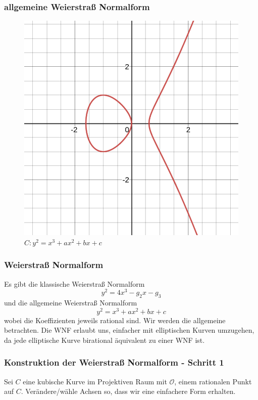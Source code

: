\documentclass{beamer}
\begin{document}
\begin{frame}
\frametitle{allgemeine Weierstraß Normalform}
    \begin{figure}
		\caption{$C: y^2=x^3+ax^2+bx+c$}
		\includegraphics[scale=0.3]{images/desmos-graph02.png}
    \end{figure}
\end{frame}

\begin{frame}
\frametitle{Weierstraß Normalform}
	Es gibt die klassische Weierstraß Normalform
	\[y^2=4x^3-g_2x-g_3\]
	und die allgemeine Weierstraß Normalform
	\[y^2=x^3+ax^2+bx+c\]
	wobei die Koeffizienten jeweils rational sind. Wir werden die
	allgemeine betrachten. Die WNF erlaubt uns, einfacher mit
	elliptischen Kurven umzugehen, da jede elliptische Kurve
	birational äquivalent zu einer WNF ist.
\end{frame}

\begin{frame}
\frametitle{Konstruktion der Weierstraß Normalform - Schritt 1}
	Sei \(C\) eine kubische Kurve im Projektiven Raum
	mit \(\mathcal{O}\), einem rationalen Punkt auf \(C\).
	Verändere/wähle Achsen so, dass wir eine einfachere Form
	erhalten.
\end{frame}
\end{document}
